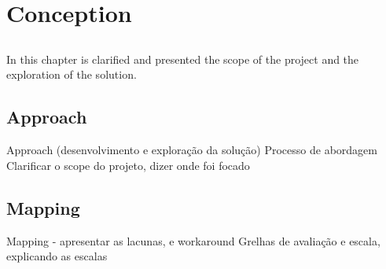 \chapter{Conception} \label{chap:conception}

\section*{}

In this chapter is clarified and presented the scope of the project and the exploration of the solution.

\section{Approach} \label{sec:Approach}



	Approach (desenvolvimento e exploração da solução)
	Processo de abordagem
	Clarificar o scope do projeto, dizer onde foi focado


\section{Mapping} \label{sec:maping}
	Mapping - apresentar as lacunas, e workaround
	Grelhas de avaliação e escala, explicando as escalas
